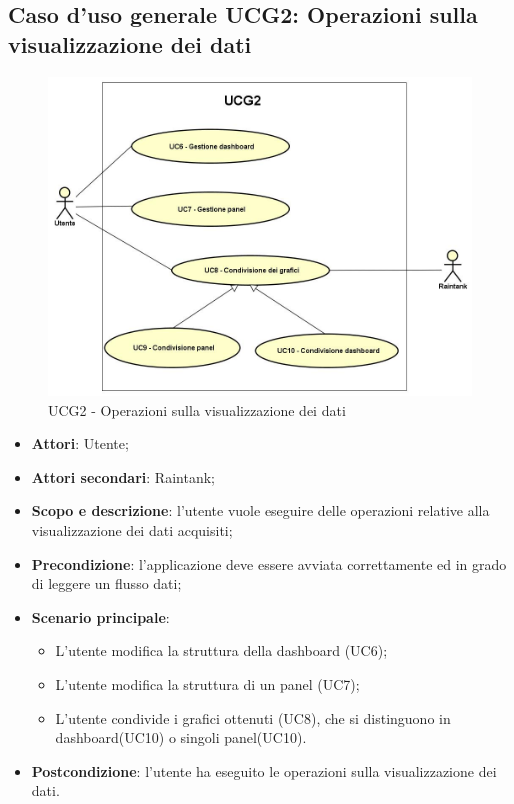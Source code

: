 \subsection{Caso d'uso generale UCG2: Operazioni sulla visualizzazione dei dati}
\begin{figure} [H]
	\centering
	\includegraphics[scale=0.5]{Img/UCG2}
	\caption{UCG2 - Operazioni sulla visualizzazione dei dati}
\end{figure}
\begin{itemize}
	\item{\textbf{Attori}: Utente;}
	\item{\textbf{Attori secondari}: Raintank;}
	\item{\textbf{Scopo e descrizione}: l'utente vuole eseguire delle operazioni relative alla visualizzazione dei dati acquisiti;}
	\item{\textbf{Precondizione}: l'applicazione deve essere avviata correttamente ed in grado di leggere un flusso dati;}
	\item{\textbf{Scenario principale}:
		\begin{itemize}
			\item{L'utente modifica la struttura della dashboard (UC6);}
			\item{L'utente modifica la struttura di un panel (UC7);}
			\item{L'utente condivide i grafici ottenuti (UC8), che si distinguono in dashboard(UC10) o singoli panel(UC10)}.
		\end{itemize}
	}
	\item{\textbf{Postcondizione}: l'utente ha eseguito le operazioni sulla visualizzazione dei dati.}
\end{itemize}
\newpage
